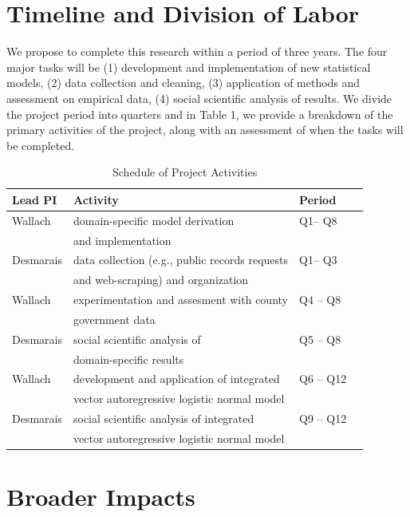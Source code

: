 \section{Timeline and Division of Labor}

We propose to complete this research within a period of three years. The four major tasks will be (1) development and implementation of new statistical models, (2) data collection and cleaning, (3) application of methods and assessment on empirical data, (4) social scientific analysis of results. We divide the project period into quarters and in Table 1, we provide a breakdown of the primary activities of the project, along with an assessment of when the tasks will be completed.


\begin{table}[h]
\caption{Schedule of Project Activities}
\begin{center}
\begin{tabular}{|l|l|l|l|}
\hline
{\bf Lead PI} & {\bf Activity} & {\bf Period} \\ \hline
Wallach & domain-specific model derivation   &   Q1-- Q8 \\
& and implementation &  \\ \hline
Desmarais & data collection (e.g., public records requests  & Q1-- Q3 \\
&  and web-scraping)  and organization & \\ \hline
Wallach & experimentation and assesment with county & Q4 -- Q8 \\
&  government data & \\ \hline
Desmarais & social scientific analysis  of & Q5 -- Q8 \\
& domain-specific results & \\ \hline
Wallach & development and application of integrated & Q6 -- Q12 \\
& vector autoregressive logistic normal model & \\ \hline
Desmarais & social scientific analysis of integrated & Q9 -- Q12 \\
& vector autoregressive logistic normal model & \\ \hline

\end{tabular}
\end{center}
\label{schedule}
\end{table}%



\section{Broader Impacts}

